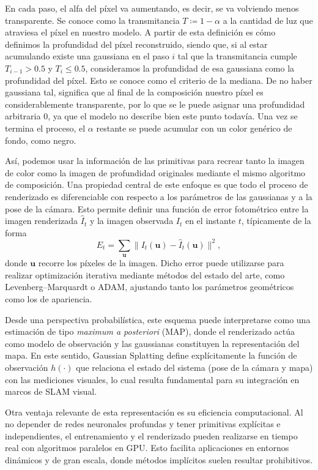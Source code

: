 En cada paso, el alfa del píxel va aumentando, es decir, se va volviendo menos transparente. Se conoce como la transmitancia $T \coloneq 1 - \alpha$ a la cantidad de luz que atraviesa el píxel en nuestro modelo. A partir de esta definición es cómo definimos la profundidad del píxel reconstruido, siendo que, si al estar acumulando existe una gaussiana en el paso $i$ tal que la transmitancia cumple $T_{i-1}>0.5$ y $T_{i} \leq 0.5$, consideramos la profundidad de esa gaussiana como la profundidad del píxel. Esto se conoce como el criterio de la mediana. De no haber gaussiana tal, significa que al final de la composición nuestro píxel es considerablemente transparente, por lo que se le puede asignar una profundidad arbitraria $0$, ya que el modelo no describe bien este punto todavía. Una vez se termina el proceso, el $\alpha$ restante se puede acumular con un color genérico de fondo, como negro.



Así, podemos usar la información de las primitivas para recrear tanto la imagen de color como la imagen de profundidad originales mediante el mismo algoritmo de composición. Una propiedad central de este enfoque es que todo el proceso de renderizado es diferenciable con respecto a los parámetros de las gaussianas y a la pose de la cámara. Esto permite definir una función de error fotométrico entre la imagen renderizada $\hat{I}_t$ y la imagen observada $I_t$ en el instante $t$, típicamente de la forma
\begin{equation}
E_t = \sum_{\mathbf{u}} \| I_t(\mathbf{u}) - \hat{I}_t(\mathbf{u}) \|^2,
\end{equation}
donde $\mathbf{u}$ recorre los píxeles de la imagen. Dicho error puede utilizarse para realizar optimización iterativa mediante métodos del estado del arte, como Levenberg--Marquardt o ADAM, ajustando tanto los parámetros geométricos como los de apariencia.

Desde una perspectiva probabilística, este esquema puede interpretarse como una estimación de tipo \emph{maximum a posteriori} (MAP), donde el renderizado actúa como modelo de observación y las gaussianas constituyen la representación del mapa. En este sentido, Gaussian Splatting define explícitamente la función de observación $h(\cdot)$ que relaciona el estado del sistema (pose de la cámara y mapa) con las mediciones visuales, lo cual resulta fundamental para su integración en marcos de SLAM visual.

Otra ventaja relevante de esta representación es su eficiencia computacional. Al no depender de redes neuronales profundas y tener primitivas explícitas e independientes, el entrenamiento y el renderizado pueden realizarse en tiempo real con algoritmos paralelos en GPU. Esto facilita aplicaciones en entornos dinámicos y de gran escala, donde métodos implícitos suelen resultar prohibitivos.

